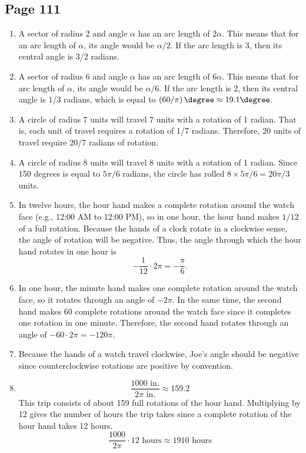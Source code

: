 \documentclass{article}
\newenvironment{solutions}[1]
{\subsection*{#1}
 \begin{enumerate}[leftmargin=1.5em]}
{\end{enumerate}}
\newcommand{\solution}{\item}
\begin{document}
\begin{solutions}{Page 111}
An angle of 80 degrees is equal to $4\pi/9$ radians. Thereforem its arc length is $5 \times 4\pi/9 = 20\pi/9$.

\solution %
A sector of radius 2 and angle $\alpha$ has an arc length of $2\alpha$. This means that for an arc length of $\alpha$, its angle would be $\alpha/2$. If the arc length is 3, then its central angle is 3/2 radians.

\solution %
A sector of radius 6 and angle $\alpha$ has an arc length of $6\alpha$. This means that for arc length of $\alpha$, its angle would be $\alpha/6$. If the arc length is 2, then its central angle is 1/3 radians, which is equal to $\left(60/\pi\right)\degree \approx 19.1\degree$.

\solution %
A circle of radius 7 units will travel 7 units with a rotation of 1 radian. That is, each unit of travel requires a rotation of 1/7 radians. Therefore, 20 units of travel require 20/7 radians of rotation.

\solution %
A circle of radius 8 units will travel 8 units with a rotation of 1 radian. Since 150 degrees is equal to $5\pi/6$ radians, the circle has rolled $8 \times 5\pi/6 = 20\pi/3$ units.

\solution %
In twelve hours, the hour hand makes a complete rotation around the watch face (e.g., 12:00 AM to 12:00 PM), so in one hour, the hour hand makes $1/12$ of a full rotation. Because the hands of a clock rotate in a clockwise sense, the angle of rotation will be negative. Thus, the angle through which the hour hand rotates in one hour is
\[
-\dfrac{1}{12} \cdot 2\pi = -\dfrac{\pi}{6}.
\]

\solution %
In one hour, the minute hand makes one complete rotation around the watch face, so it rotates through an angle of $-2\pi$. In the same time, the second hand makes 60 complete rotations around the watch face since it completes one rotation in one minute. Therefore, the second hand rotates through an angle of $-60 \cdot 2\pi = -120\pi$.

\solution %
Because the hands of a watch travel clockwise, Joe's angle should be negative since counterclockwise rotations are positive by convention.

\solution %
\[
\dfrac{1000 \text{ in.}}{2\pi \text{ in.}} \approx 159.2
\]
This trip consists of about 159 full rotations of the hour hand. Multiplying by 12 gives the number of hours the trip takes since a complete rotation of the hour hand takes 12 hours.
\[
\dfrac{1000}{2\pi} \cdot 12\text{ hours} \approx 1910\text{ hours}
\]


\end{solutions}
\end{document}
